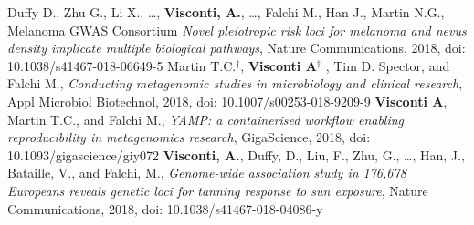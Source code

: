 \documentclass[a4paper,10pt]{article}
\begin{document}
{\begin{itemize}
		 Duffy D., Zhu G., Li X., \dots, \textbf{Visconti, A.}, \dots, Falchi M., Han J., Martin N.G., Melanoma GWAS Consortium \emph{Novel pleiotropic risk loci for melanoma and nevus density implicate multiple biological pathways}, Nature Communications, 2018, doi: 10.1038/s41467-018-06649-5		
		 Martin T.C.$^{\textbf{$\dag $}}$, \textbf{Visconti A}$^{\textbf{$\dag $}}$ , Tim D. Spector, and Falchi M., \emph{Conducting metagenomic studies in microbiology and clinical research}, Appl Microbiol Biotechnol, 2018, doi: 10.1007/s00253-018-9209-9
		 \textbf{Visconti A}, Martin T.C., and Falchi M., \emph{YAMP: a containerised workflow enabling reproducibility in metagenomics research}, GigaScience, 2018, doi: 10.1093/gigascience/giy072
		  \textbf{Visconti, A.}, Duffy, D., Liu, F., Zhu, G., \dots, Han, J., Bataille, V., and Falchi, M., \emph{Genome-wide association study in 176,678 Europeans reveals genetic loci for tanning response to sun exposure}, Nature Communications, 2018, doi: 10.1038/s41467-018-04086-y
		
	\end{itemize}
}
\end{document}
